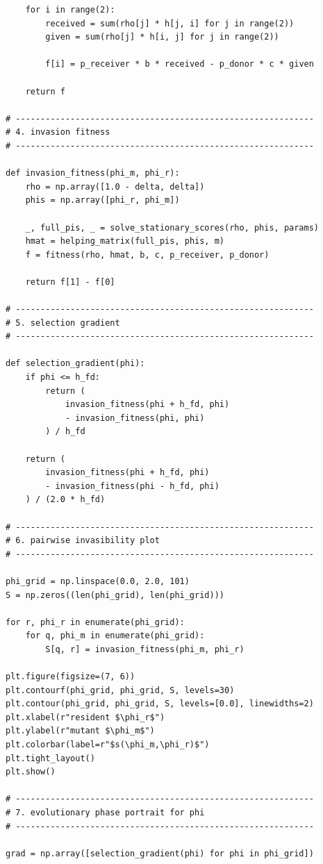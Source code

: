 \documentclass[11pt]{article}
\begin{document}
\begin{lstlisting}
    for i in range(2):
        received = sum(rho[j] * h[j, i] for j in range(2))
        given = sum(rho[j] * h[i, j] for j in range(2))

        f[i] = p_receiver * b * received - p_donor * c * given

    return f

# ------------------------------------------------------------
# 4. invasion fitness
# ------------------------------------------------------------

def invasion_fitness(phi_m, phi_r):
    rho = np.array([1.0 - delta, delta])
    phis = np.array([phi_r, phi_m])

    _, full_pis, _ = solve_stationary_scores(rho, phis, params)
    hmat = helping_matrix(full_pis, phis, m)
    f = fitness(rho, hmat, b, c, p_receiver, p_donor)

    return f[1] - f[0]

# ------------------------------------------------------------
# 5. selection gradient
# ------------------------------------------------------------

def selection_gradient(phi):
    if phi <= h_fd:
        return (
            invasion_fitness(phi + h_fd, phi)
            - invasion_fitness(phi, phi)
        ) / h_fd

    return (
        invasion_fitness(phi + h_fd, phi)
        - invasion_fitness(phi - h_fd, phi)
    ) / (2.0 * h_fd)

# ------------------------------------------------------------
# 6. pairwise invasibility plot
# ------------------------------------------------------------

phi_grid = np.linspace(0.0, 2.0, 101)
S = np.zeros((len(phi_grid), len(phi_grid)))

for r, phi_r in enumerate(phi_grid):
    for q, phi_m in enumerate(phi_grid):
        S[q, r] = invasion_fitness(phi_m, phi_r)

plt.figure(figsize=(7, 6))
plt.contourf(phi_grid, phi_grid, S, levels=30)
plt.contour(phi_grid, phi_grid, S, levels=[0.0], linewidths=2)
plt.xlabel(r"resident $\phi_r$")
plt.ylabel(r"mutant $\phi_m$")
plt.colorbar(label=r"$s(\phi_m,\phi_r)$")
plt.tight_layout()
plt.show()

# ------------------------------------------------------------
# 7. evolutionary phase portrait for phi
# ------------------------------------------------------------

grad = np.array([selection_gradient(phi) for phi in phi_grid])


\end{lstlisting}
\end{document}
